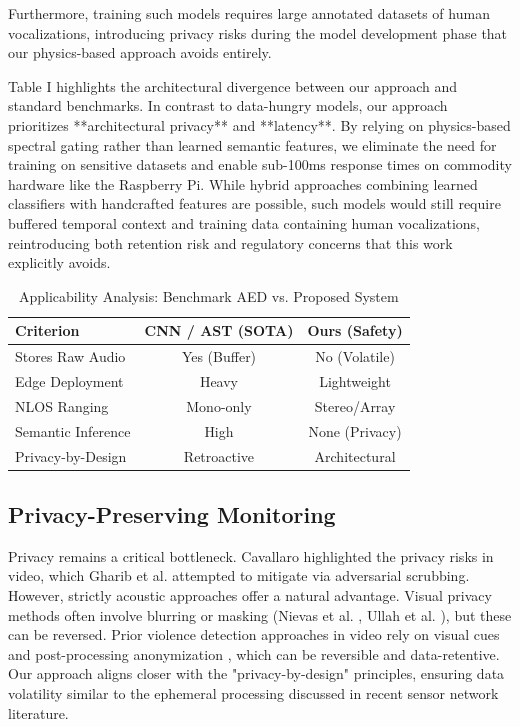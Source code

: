 \documentclass[conference]{IEEEtran}
\begin{document}
Furthermore, training such models requires large annotated datasets of human vocalizations, introducing privacy risks during the model development phase that our physics-based approach avoids entirely.

Table I highlights the architectural divergence between our approach and standard benchmarks. In contrast to data-hungry models, our approach prioritizes **architectural privacy** and **latency**. By relying on physics-based spectral gating rather than learned semantic features, we eliminate the need for training on sensitive datasets and enable sub-100ms response times on commodity hardware like the Raspberry Pi. While hybrid approaches combining learned classifiers with handcrafted features are possible, such models would still require buffered temporal context and training data containing human vocalizations, reintroducing both retention risk and regulatory concerns that this work explicitly avoids.

\begin{table}[htbp]
\caption{Applicability Analysis: Benchmark AED vs. Proposed System}
\begin{center}
\begin{tabular}{lcc}
\toprule
\textbf{Criterion} & \textbf{CNN / AST (SOTA)} & \textbf{Ours (Safety)} \\
\midrule
Stores Raw Audio & Yes (Buffer) & No (Volatile) \\
Edge Deployment & Heavy & Lightweight \\
NLOS Ranging & Mono-only & Stereo/Array \\
Semantic Inference & High & None (Privacy) \\
Privacy-by-Design & Retroactive & Architectural \\
\bottomrule
\end{tabular}
\end{center}
\label{tab:comparison}
\end{table}

\subsection{Privacy-Preserving Monitoring}
Privacy remains a critical bottleneck. Cavallaro \cite{b1} highlighted the privacy risks in video, which Gharib et al. \cite{b4} attempted to mitigate via adversarial scrubbing. However, strictly acoustic approaches offer a natural advantage. Visual privacy methods often involve blurring or masking (Nievas et al. \cite{b16}, Ullah et al. \cite{b17}), but these can be reversed. Prior violence detection approaches in video rely on visual cues and post-processing anonymization \cite{b16, b17}, which can be reversible and data-retentive. Our approach aligns closer with the "privacy-by-design" principles, ensuring data volatility similar to the ephemeral processing discussed in recent sensor network literature.
\end{document}
